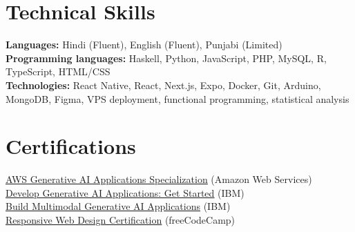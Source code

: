 \documentclass[10pt,a4paper]{article}
\let\oldhref\href
\renewcommand{\href}[2]{\oldhref{#1}{\underline{#2}}}
\begin{document}
\section{Technical Skills}
\textbf{Languages:} Hindi (Fluent), English (Fluent), Punjabi (Limited)\\[3pt]
\textbf{Programming languages:} Haskell, Python, JavaScript, PHP, MySQL, R, TypeScript, HTML/CSS\\[3pt]
\textbf{Technologies:} React Native, React, Next.js, Expo, Docker, Git, Arduino, MongoDB, Figma, VPS deployment, functional programming, statistical analysis

\section{Certifications}
\href{https://www.coursera.org/account/accomplishments/specialization/PN5IWTDLCLM4}{AWS Generative AI Applications Specialization} (Amazon Web Services)\\
\href{https://www.coursera.org/account/accomplishments/records/LA0XQ4ZDWT71}{Develop Generative AI Applications: Get Started} (IBM)\\
\href{https://www.coursera.org/account/accomplishments/records/SHYMPEFXLRIJ}{Build Multimodal Generative AI Applications} (IBM)\\
\href{https://freecodecamp.org/certification/fccf1fd339f-e2d2-48d3-bc54-8375ab707b28/responsive-web-design}{Responsive Web Design Certification} (freeCodeCamp)
\end{document}
